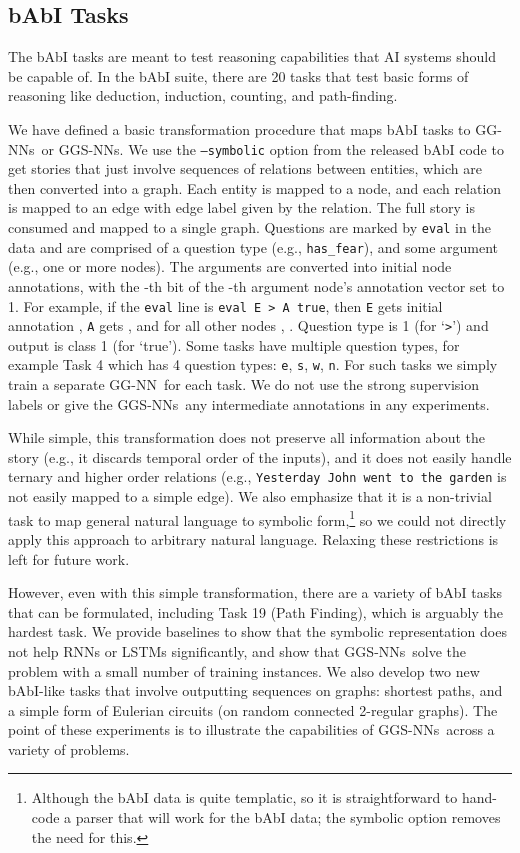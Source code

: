 \documentclass{article} \usepackage{iclr2016_conference,times}
\newcommand{\OurMethodMinorShort}{GG-NN}
\newcommand{\OurMethodMinorShorts}{\OurMethodMinorShort s}
\newcommand{\OurMethodShort}{GGS-NN}
\newcommand{\OurMethodShorts}{\OurMethodShort s}
\begin{document}
\subsection{bAbI Tasks}
The bAbI tasks are meant to test reasoning capabilities that AI systems should be capable of.
In the bAbI suite, there are 20 tasks that test basic forms of reasoning like deduction, induction, counting,
and path-finding.

We have defined a basic transformation procedure that maps bAbI tasks
to \OurMethodMinorShorts~or \OurMethodShorts. We use the \texttt{--symbolic} option from the
released bAbI code to get stories that just involve sequences
of relations between entities, which are then converted into a graph. Each entity is mapped to a
node, and each relation is mapped to an edge with edge label given by the
relation. The full story is consumed and mapped to a single
graph.  Questions are marked by \texttt{eval} in the data and are comprised
of a question type (e.g., \texttt{has\_fear}), and some
argument (e.g., one or more nodes). The arguments are converted into
initial node annotations, with the -th bit of the -th argument node's
annotation vector set to 1.
For example, if the \texttt{eval} line is \texttt{eval E > A true}, then \texttt{E} gets
initial annotation , \texttt{A} gets
, and for all other nodes ,
. Question type is 1 (for
`\texttt{>}') and output is class 1 (for `true').
Some tasks have multiple question types, for example Task 4 which has 4
question types: \texttt{e}, \texttt{s}, \texttt{w}, \texttt{n}. For such tasks
we simply train a separate \OurMethodMinorShort~for each task.
We do not use the strong supervision labels or give the \OurMethodShorts~any
intermediate annotations in any experiments.

While simple, this transformation does not preserve all
information about the story (e.g., it discards temporal order of the
inputs), and it does not easily handle ternary and higher order
relations (e.g., \texttt{Yesterday John went to the garden} is not
easily mapped to a simple edge).
We also emphasize that it is a non-trivial task to map general natural language to symbolic form,\footnote{Although the bAbI data is quite templatic, so it is straightforward to hand-code a parser that will work for the bAbI data; the symbolic option removes the need for this.}
so we could not directly apply this approach to arbitrary natural language.
Relaxing these restrictions is left for future work.

However, even with this simple transformation, there are a variety of
bAbI tasks that can be formulated, including Task 19 (Path Finding),
which is arguably the hardest task. We provide baselines to show that
the symbolic representation does not help RNNs or LSTMs significantly,
and show that \OurMethodShorts~solve the problem with a small number
of training instances. We also develop two new bAbI-like tasks that
involve outputting sequences on graphs: shortest paths, and a simple
form of Eulerian circuits (on random connected 2-regular graphs).
The point of these experiments is to illustrate the capabilities
of \OurMethodShorts~across a variety of problems.
\end{document}
